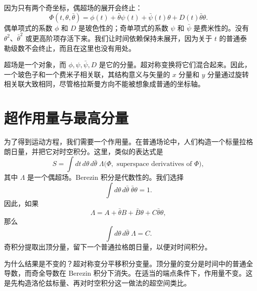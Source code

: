 因为只有两个奇坐标，偶超场的展开会终止：
\begin{equation}
\Phi(t,\theta,\bar\theta)
=\phi(t)+\bar\theta\psi(t)+\bar\psi(t)\theta
+D(t)\bar\theta\theta.
\label{eq:l7-superfield}
\end{equation}
偶单项式的系数 \(\phi\) 和 \(D\) 是玻色性的；奇单项式的系数 \(\psi\) 和 \(\bar\psi\) 是费米性的。没有 \(\theta^2\)、\(\bar\theta^2\) 或更高阶项存活下来。我们让时间依赖保持未展开，因为关于 \(t\) 的普通泰勒级数不会终止，而且在这里也没有用处。

\begin{classroomqa}
\end{classroomqa}

超场是一个对象，而 \(\phi,\psi,\bar\psi,D\) 是它的分量。超对称变换将它们混合起来。因此，一个玻色子和一个费米子相关联，其结构意义与矢量的 \(x\) 分量和 \(y\) 分量通过旋转相关联大致相同，尽管格拉斯曼方向不能被想象成普通的坐标轴。

\section{超作用量与最高分量}

为了得到运动方程，我们需要一个作用量。在普通场论中，人们构造一个标量拉格朗日量，并把它对时空积分。这里，类似的表达式是
\begin{equation}
S=\int dt\,d\theta\,d\bar\theta\;\Lambda
\bigl(\Phi,\text{ superspace derivatives of }\Phi\bigr),
\label{eq:l7-superaction}
\end{equation}
其中 \(\Lambda\) 是一个偶超场。Berezin 积分是代数性的。我们选择
\begin{equation}
\int d\theta\,d\bar\theta\;\bar\theta\theta=1.
\end{equation}
因此，如果
\begin{equation}
\Lambda=A+\bar\theta B+\bar B\theta+C\bar\theta\theta,
\end{equation}
那么
\begin{equation}
\int d\theta\,d\bar\theta\;\Lambda=C.
\label{eq:l7-top-component}
\end{equation}
奇积分提取出顶分量，留下一个普通拉格朗日量，以便对时间积分。

为什么结果是不变的？超对称变分平移积分变量。顶分量的变分是时间中的普通全导数，而奇全导数在 Berezin 积分下消失。在适当的端点条件下，作用量不变。这是先构造洛伦兹标量、再对时空积分这一做法的超空间类比。

